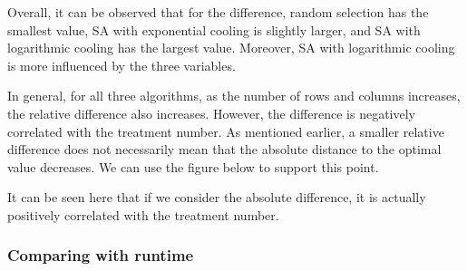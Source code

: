 \documentclass[
  a4paper,
  oneside,
  openany,
  12pt,
  onecolumn]{book}
\theoremstyle{plain}
\theoremstyle{definition}
\theoremstyle{remark}
\begin{document}
Overall, it can be observed that for the difference, random selection
has the smallest value, SA with exponential cooling is slightly larger,
and SA with logarithmic cooling has the largest value. Moreover, SA with
logarithmic cooling is more influenced by the three variables.

In general, for all three algorithms, as the number of rows and columns
increases, the relative difference also increases. However, the
difference is negatively correlated with the treatment number. As
mentioned earlier, a smaller relative difference does not necessarily
mean that the absolute distance to the optimal value decreases. We can
use the figure below to support this point.

\begin{figure}


\caption{\label{fig-align}}

\end{figure}%

It can be seen here that if we consider the absolute difference, it is
actually positively correlated with the treatment number.

\subsubsection{Comparing with runtime}\label{comparing-with-runtime}
\end{document}
